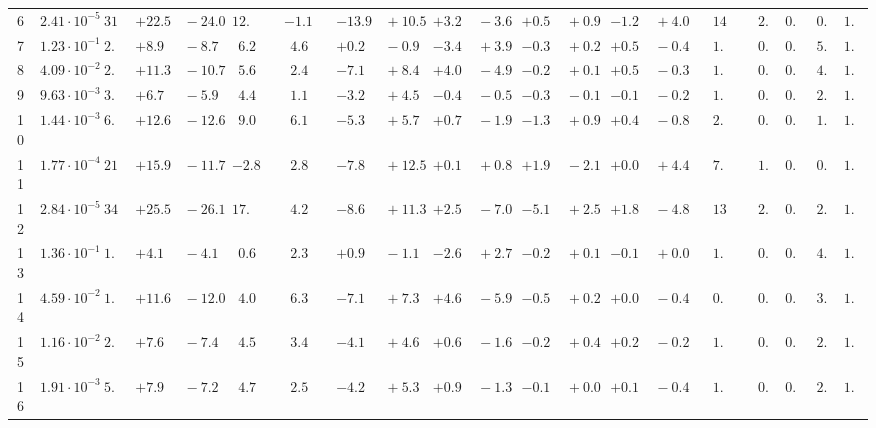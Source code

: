 \documentclass[12pt]{article}
\begin{document}
\begin{table}
\begin{tabular}{ccrr@{\hskip0pt}rrc@{\hskip0pt}r@{\hskip0pt}c@{\hskip0pt}r@{\hskip0pt}rr@{\hskip0pt}rr@{\hskip0pt}rr@{\hskip0pt}rr@{\hskip0pt}r@{\hskip0pt}r@{\hskip0pt}c|rr|r}
6 &$2.41 \cdot 10^{-5}$ &$31.1$  & ${+22.5~}$&${~-24.0}$ & $12.0$  & &$-1.1$&&${-13.9~}$&${~+10.5}$ & ${+3.2~}$&${~-3.6}$ & ${+0.5~}$&${~+0.9}$ & ${-1.2~}$&${~+4.0}$ & &$14.6$&&$ 2.8$  & $0.95$  & $ 0.2$  & $1.05$   \\ 
7 &$1.23 \cdot 10^{-1}$ &$ 2.0$  & ${+8.9~}$&${~-8.7}$ & $ 6.2$  & &$ 4.6$&&${+0.2~}$&${~-0.9}$ & ${-3.4~}$&${~+3.9}$ & ${-0.3~}$&${~+0.2}$ & ${+0.5~}$&${~-0.4}$ & &$ 1.2$&&$ 0.4$  & $0.87$  & $ 5.4$  & $1.02$   \\ 
8 &$4.09 \cdot 10^{-2}$ &$ 2.2$  & ${+11.3~}$&${~-10.7}$ & $ 5.6$  & &$ 2.4$&&${-7.1~}$&${~+8.4}$ & ${+4.0~}$&${~-4.9}$ & ${-0.2~}$&${~+0.1}$ & ${+0.5~}$&${~-0.3}$ & &$ 1.1$&&$ 0.3$  & $0.90$  & $ 4.2$  & $1.02$   \\ 
9 &$9.63 \cdot 10^{-3}$ &$ 3.0$  & ${+6.7~}$&${~-5.9}$ & $ 4.4$  & &$ 1.1$&&${-3.2~}$&${~+4.5}$ & ${-0.4~}$&${~-0.5}$ & ${-0.3~}$&${~-0.1}$ & ${-0.1~}$&${~-0.2}$ & &$ 1.2$&&$ 0.7$  & $0.93$  & $ 2.8$  & $1.02$   \\ 
10 &$1.44 \cdot 10^{-3}$ &$ 6.9$  & ${+12.6~}$&${~-12.6}$ & $ 9.0$  & &$ 6.1$&&${-5.3~}$&${~+5.7}$ & ${+0.7~}$&${~-1.9}$ & ${-1.3~}$&${~+0.9}$ & ${+0.4~}$&${~-0.8}$ & &$ 2.3$&&$ 0.6$  & $0.95$  & $ 1.9$  & $1.03$   \\ 
11 &$1.77 \cdot 10^{-4}$ &$21.2$  & ${+15.9~}$&${~-11.7}$ & $-2.8$  & &$ 2.8$&&${-7.8~}$&${~+12.5}$ & ${+0.1~}$&${~+0.8}$ & ${+1.9~}$&${~-2.1}$ & ${+0.0~}$&${~+4.4}$ & &$ 7.4$&&$ 1.3$  & $0.95$  & $ 0.9$  & $1.04$   \\ 
12 &$2.84 \cdot 10^{-5}$ &$34.8$  & ${+25.5~}$&${~-26.1}$ & $17.3$  & &$ 4.2$&&${-8.6~}$&${~+11.3}$ & ${+2.5~}$&${~-7.0}$ & ${-5.1~}$&${~+2.5}$ & ${+1.8~}$&${~-4.8}$ & &$13.5$&&$ 2.8$  & $0.96$  & $ 2.0$  & $1.03$   \\ 
13 &$1.36 \cdot 10^{-1}$ &$ 1.9$  & ${+4.1~}$&${~-4.1}$ & $ 0.6$  & &$ 2.3$&&${+0.9~}$&${~-1.1}$ & ${-2.6~}$&${~+2.7}$ & ${-0.2~}$&${~+0.1}$ & ${-0.1~}$&${~+0.0}$ & &$ 1.0$&&$ 0.2$  & $0.88$  & $ 4.7$  & $1.02$   \\ 
14 &$4.59 \cdot 10^{-2}$ &$ 1.9$  & ${+11.6~}$&${~-12.0}$ & $ 4.0$  & &$ 6.3$&&${-7.1~}$&${~+7.3}$ & ${+4.6~}$&${~-5.9}$ & ${-0.5~}$&${~+0.2}$ & ${+0.0~}$&${~-0.4}$ & &$ 0.9$&&$ 0.6$  & $0.91$  & $ 3.8$  & $1.02$   \\ 
15 &$1.16 \cdot 10^{-2}$ &$ 2.7$  & ${+7.6~}$&${~-7.4}$ & $ 4.5$  & &$ 3.4$&&${-4.1~}$&${~+4.6}$ & ${+0.6~}$&${~-1.6}$ & ${-0.2~}$&${~+0.4}$ & ${+0.2~}$&${~-0.2}$ & &$ 1.0$&&$ 0.8$  & $0.93$  & $ 2.8$  & $1.03$   \\ 
16 &$1.91 \cdot 10^{-3}$ &$ 5.9$  & ${+7.9~}$&${~-7.2}$ & $ 4.7$  & &$ 2.5$&&${-4.2~}$&${~+5.3}$ & ${+0.9~}$&${~-1.3}$ & ${-0.1~}$&${~+0.0}$ & ${+0.1~}$&${~-0.4}$ & &$ 1.7$&&$ 0.8$  & $0.95$  & $ 2.0$  & $1.04$   \\ 

\end{tabular}
\end{table}
\end{document}
